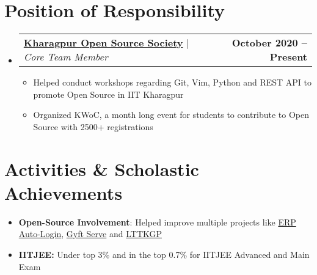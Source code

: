 \documentclass[letterpaper,11pt]{article}
\makeatletter
\newcommand{\resumeItem}[1]{
  \item\small{
    {#1 \vspace{-2pt}}
  }
}
\newcommand{\resumeProjectHeading}[2]{
    \item
    \begin{tabular*}{1.001\textwidth}{l@{\extracolsep{\fill}}r}
      \small#1 & \textbf{\small #2}\\
    \end{tabular*}\vspace{-7pt}
}
\newcommand{\resumeSubHeadingListStart}{\begin{itemize}[leftmargin=0.0in, label={}]}
\newcommand{\resumeSubHeadingListEnd}{\end{itemize}}
\newcommand{\resumeItemListStart}{\begin{itemize}}
\newcommand{\resumeItemListEnd}{\end{itemize}\vspace{-5pt}}
\makeatother
\begin{document}
\section{Position of Responsibility}
\resumeSubHeadingListStart
    \resumeProjectHeading
    {\textbf{\href{https://github.com/kgpyaar-tech}{Kharagpur Open Source Society}} $|$ \emph{Core Team Member}}{October 2020 -- Present}
    \resumeItemListStart
    \resumeItem{Helped conduct workshops regarding Git, Vim, Python and REST API to promote Open Source in IIT Kharagpur}
    \resumeItem{Organized KWoC, a month long event for students to contribute to Open Source with 2500+ registrations}
    \resumeItemListEnd
\resumeSubHeadingListEnd

\section{Activities \& Scholastic Achievements}
\begin{itemize}[leftmargin=0.15in, label={}]
\item \textbf{Open-Source Involvement}: Helped improve multiple projects like {\href{https://github.com/metakgp/erp-auto-login} {ERP Auto-Login}}, {\href {https://github.com/metakgp/gyft-serve}{Gyft Serve}} and {\href{https://github.com/lttkgp}{LTTKGP}}


\item\textbf{IITJEE:} Under top 3\% and in the top 0.7\% for IITJEE Advanced and Main Exam



\end{itemize}


\end{document}
